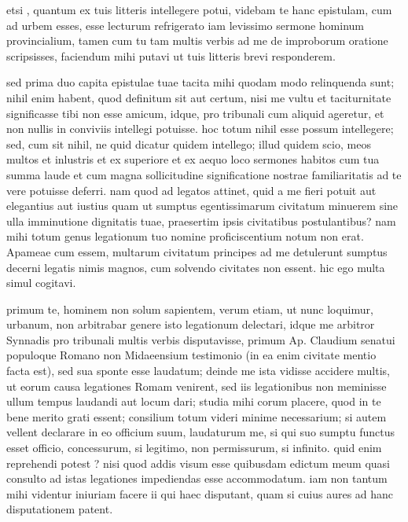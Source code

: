 


 etsi , quantum ex tuis litteris intellegere potui, videbam te hanc epistulam, cum ad urbem esses, esse lecturum refrigerato iam levissimo sermone hominum provincialium, tamen cum tu tam multis verbis ad me de improborum oratione scripsisses, faciendum mihi putavi ut tuis litteris brevi responderem.

 sed prima duo capita epistulae tuae tacita mihi quodam modo relinquenda sunt; nihil enim habent, quod definitum sit aut certum, nisi me vultu et taciturnitate significasse tibi non esse amicum, idque, pro tribunali cum aliquid ageretur, et non nullis in conviviis intellegi potuisse. hoc totum nihil esse possum intellegere; sed, cum sit nihil, ne quid dicatur quidem intellego; illud quidem scio, meos multos et inlustris et ex superiore et ex aequo loco sermones habitos cum tua summa laude et cum magna sollicitudine significatione nostrae familiaritatis ad te vere potuisse deferri. nam quod ad legatos attinet, quid a me fieri potuit aut elegantius aut iustius quam ut sumptus egentissimarum civitatum minuerem sine ulla imminutione dignitatis tuae, praesertim ipsis civitatibus postulantibus? nam mihi totum genus legationum tuo nomine proficiscentium notum non erat. Apameae cum essem, multarum civitatum principes ad me detulerunt sumptus decerni legatis nimis magnos, cum solvendo civitates non essent. hic ego multa simul cogitavi.

 primum te, hominem non solum sapientem, verum etiam, ut nunc loquimur, urbanum, non arbitrabar genere isto legationum delectari, idque me arbitror Synnadis pro tribunali multis verbis disputavisse, primum Ap. Claudium senatui populoque Romano non Midaeensium testimonio (in ea enim civitate mentio facta est), sed sua sponte esse laudatum; deinde me ista vidisse accidere multis, ut eorum causa legationes Romam venirent, sed iis legationibus non meminisse ullum tempus laudandi aut locum dari; studia mihi corum placere, quod in te bene merito grati essent; consilium totum videri minime necessarium; si autem vellent declarare in eo officium suum, laudaturum me, si qui suo sumptu functus esset officio, concessurum, si legitimo, non permissurum, si infinito. quid enim reprehendi potest ? nisi quod addis visum esse quibusdam edictum meum quasi consulto ad istas legationes impediendas esse accommodatum. iam non tantum mihi videntur iniuriam facere ii qui haec disputant, quam si cuius aures ad hanc disputationem patent.

